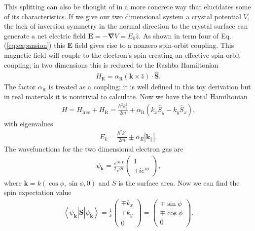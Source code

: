 \documentclass[12pt]{article}
\begin{document}
This splitting can also be thought of in a more concrete way that elucidates some of its characteristics.
If we give our two dimensional system a crystal potential $V$, the lack of inversion symmetry in the normal direction to the crystal surface can generate a net electric field $\boldsymbol{E}=-\boldsymbol{\nabla}V=E_0\hat{z}$.
As shown in term four of Eq. (\ref{eq:expansion}) this $\boldsymbol{E}$ field gives rise to a nonzero spin-orbit coupling.
This magnetic field will couple to the electron's spin creating an effective spin-orbit coupling; in two dimensions this is reduced to the Rashba Hamiltonian
\begin{align}
  \label{eq:rashba}
  H_{\text{R}}=\alpha_{\text{R}}(\boldsymbol{k}\times\hat{z})\cdot\hat{\boldsymbol{S}}\text{.}
\end{align}
The factor $\alpha_{\text{R}}$ is treated as a coupling; it is well defined in this toy derivation but in real materials it is nontrivial to calculate.
Now we have the total Hamiltonian
\begin{align}
  \label{eq:totalH}
  H=H_{\text{free}}+H_{\text{R}}=\frac{\hbar^2k_\parallel^2}{2m}+\alpha_{\text{R}}(k_x\hat{S}_y-k_y\hat{S}_x)\text{,}
\end{align}
with eigenvalues
\begin{align}
  \label{eq:eigenvalues}
  E_k=\frac{\hbar^2k_{\parallel}^2}{2m}\pm\alpha_{R}\left|\boldsymbol{k}_{\parallel}\right|\text{.}
\end{align}
The wavefunctions for the two dimensional electron gas are
\begin{align}
  \label{eq:wavefn}
  \psi_{\boldsymbol{k}}=\frac{e^{i\boldsymbol{k}\cdot\boldsymbol{r}}}{2\sqrt{S}}\left(\begin{array}{c} 1 \\ \mp ie^{i\phi} \end{array} \right)\text{,}
\end{align}
where $\boldsymbol{k}=k(\cos\phi,\sin\phi,0)$ and $S$ is the surface area.
Now we can find the spin expectation value
\begin{align}
  \label{eq:expectation}
  \left<\psi_{\boldsymbol{k}}\left|\hat{\boldsymbol{S}}\right|\psi_{\boldsymbol{k}}\right>=\frac{1}{k}\left(\begin{array}{c} \mp k_x \\ \mp k_y \\ 0 \end{array} \right) = \left(\begin{array}{c} \mp \sin\phi \\ \mp \cos\phi \\ 0 \end{array} \right)\text{.}
\end{align}
\end{document}
